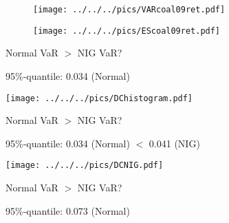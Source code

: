 	\begin{figure}
	\begin{center}
	\texttt{[image: ../../../pics/VARcoal09ret.pdf]}
	\end{center}
	\end{figure}

	\begin{figure}
	\begin{center}
	\texttt{[image: ../../../pics/EScoal09ret.pdf]}
	\end{center}
	\end{figure}

	\begin{center}
	Normal VaR $>$ NIG VaR?
	\end{center}
	95\%-quantile: \hspace{2cm} 0.034 (Normal) \hspace{1cm}\\
	\begin{center}
	\texttt{[image: ../../../pics/DChistogram.pdf]}
	\end{center}

	\begin{center}
	Normal VaR $>$ NIG VaR?
	\end{center}

	95\%-quantile: \hspace{1cm} 0.034 (Normal)  \hspace{1cm}$<$ \hspace{1cm} 0.041 (NIG)\\

	\begin{center}
	\texttt{[image: ../../../pics/DCNIG.pdf]}
	\end{center}

	\begin{center}
	Normal VaR $>$ NIG VaR?
	\end{center}
	95\%-quantile: \hspace{1cm} 0.073 (Normal) \hspace{1cm} \\

